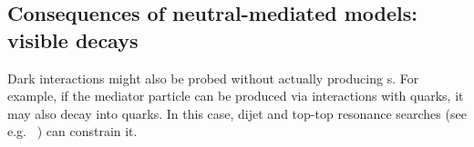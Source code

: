 \subsection{Consequences of neutral-mediated models: visible decays}
\label{sec:MediatorSearches}
\label{sub:twoBody}





Dark interactions might also be probed without actually producing {\IP}s.
For example, if the mediator particle can be produced via interactions with quarks, it may also decay into quarks. 
In this case, dijet and top-top resonance searches (see e.g. ~\cite{Liew:2016oon,Chala:2015ama}) can constrain it.


